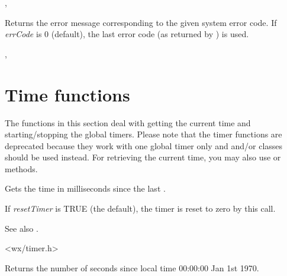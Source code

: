 
,

\label{wxsyserrormsg}


Returns the error message corresponding to the given system error code. If
{\it errCode} is $0$ (default), the last error code (as returned by
) is used.


,

\section{Time functions}\label{timefunctions}

The functions in this section deal with getting the current time and
starting/stopping the global timers. Please note that the timer functions are
deprecated because they work with one global timer only and
 and/or  classes
should be used instead. For retrieving the current time, you may also use
 or
 methods.

\label{wxgetelapsedtime}


Gets the time in milliseconds since the last .

If {\it resetTimer} is TRUE (the default), the timer is reset to zero
by this call.

See also .


<wx/timer.h>

\label{wxgetlocaltime}


Returns the number of seconds since local time 00:00:00 Jan 1st 1970.



